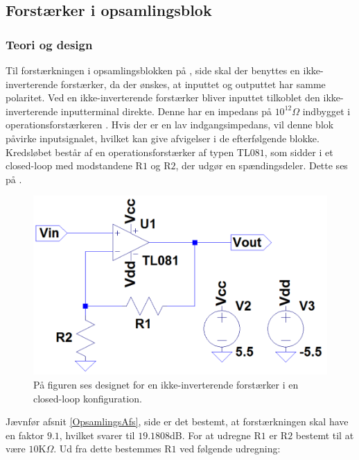 \subsection{Forstærker i opsamlingsblok}\label{Subsec:Forstaerker}
\subsubsection{Teori og design}
Til forstærkningen i opsamlingsblokken på , side \pageref{kravblok} skal der benyttes en ikke-inverterende forstærker, da der ønskes, at inputtet og outputtet har samme polaritet. Ved en ikke-inverterende forstærker bliver inputtet tilkoblet den ikke-inverterende inputterminal direkte. Denne har en impedans på $10^{12}\Omega$ indbygget i operationsforstærkeren \cite{Corporation1995}. Hvis der er en lav indgangsimpedans, vil denne blok påvirke inputsignalet, hvilket kan give afvigelser i de efterfølgende blokke. \\
Kredsløbet består af en operationsforstærker af typen TL$081$, som sidder i et closed-loop med modstandene R$1$ og R$2$, der udgør en spændingsdeler. Dette ses på .
\begin{figure}[H]
\centering
\includegraphics[scale=0.45]{figures/cProblemloesning/Forstaerker.PNG}
\caption{På figuren ses designet for en ikke-inverterende forstærker i en closed-loop konfiguration.}
\label{fig:Forstaerker}
\end{figure} 
\noindent Jævnfør afsnit \ref{OpsamlingsAfs}, side \pageref{OpsamlingsAfs} er det bestemt, at forstærkningen skal have en faktor $9.1$, hvilket svarer til $19.1808$dB. For at udregne R$1$ er R$2$ bestemt til at være $10$K$\Omega$. \cite{Nilsson2011} Ud fra dette bestemmes R$1$ ved følgende udregning:
